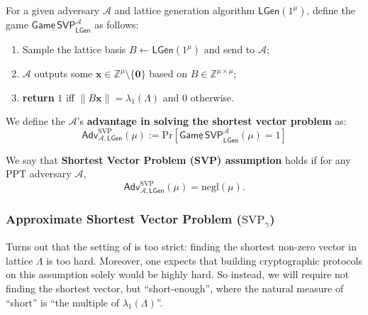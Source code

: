 \documentclass{template}
\begin{document}
\begin{definition}\label{def:svp}
    For a given adversary $\mathcal{A}$ and lattice generation algorithm
    $\mathsf{LGen}(1^{\mu})$, define the game
    $\underline{\mathsf{Game}\,\mathsf{SVP}}^{\mathcal{A}}_{\mathsf{LGen}}$ as follows:
    \begin{enumerate}
        \item Sample the lattice basis $B \gets \mathsf{LGen}(1^{\mu})$ and send to $\mathcal{A}$;
        \item $\mathcal{A}$ outputs some $\mathbf{x} \in \mathbb{Z}^{\mu} \setminus \{\mathbf{0}\}$ based on $B \in \mathbb{Z}^{\mu \times \mu}$;
        \item \textbf{return} $1$ iff $\|B\mathbf{x}\|=\lambda_1(\Lambda)$ and $0$ otherwise.
    \end{enumerate}
    We define the $\mathcal{A}$'s \textbf{advantage in solving the shortest
    vector problem} as:
    \begin{equation*}
        \mathsf{Adv}^{\text{SVP}}_{\mathcal{A},\mathsf{LGen}}(\mu) := \text{Pr}\left[\underline{\mathsf{Game}\,\mathsf{SVP}}^{\mathcal{A}}_{\mathsf{LGen}}(\mu) = 1\right]
    \end{equation*} 
\end{definition}

\begin{definition}
    We say that \textbf{Shortest Vector Problem (SVP) assumption} holds if for 
    any PPT adversary $\mathcal{A}$,
    \begin{equation*}
        \mathsf{Adv}^{\text{SVP}}_{\mathcal{A},\mathsf{LGen}}(\mu) = \text{negl}(\mu).
    \end{equation*}
\end{definition}

\subsubsection{Approximate Shortest Vector Problem ($\text{SVP}_{\gamma}$)}

Turns out that the setting of  is too strict: finding the shortest
non-zero vector in lattice $\Lambda$ is too hard. Moreover, one expects that
building cryptographic protocols on this assumption solely would be highly hard.
So instead, we will require not finding the shortest vector, but
``short-enough'', where the natural measure of ``short'' is ``the multiple of
$\lambda_1(\Lambda)$''.
\end{document}

